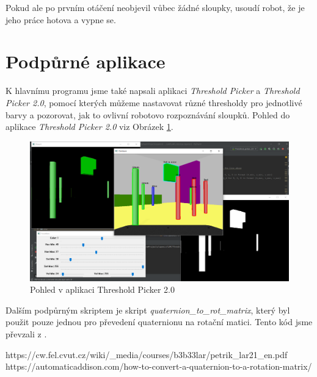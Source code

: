 \documentclass{article}
\begin{document}
Pokud ale po prvním otáčení neobjevil vůbec žádné sloupky, usoudí robot, že je jeho práce hotova a vypne se.

\section{Podpůrné aplikace}
K hlavnímu programu jsme také napsali aplikaci \textit{Threshold Picker} a \textit{Threshold Picker 2.0}, pomocí kterých můžeme nastavovat různé thresholdy pro jednotlivé barvy a pozorovat, jak to ovlivní robotovo rozpoznávání sloupků. Pohled do aplikace \textit{Threshold Picker 2.0} viz Obrázek \ref{thr_picker}.
\begin{figure}[H]
	\centering
	\includegraphics[scale=0.3]{Threshold_Picker.png}
	\caption{Pohled v aplikaci Threshold Picker 2.0}
	\label{thr_picker}
\end{figure}
Dalším podpůrným skriptem je skript \textit{quaternion\_to\_rot\_matrix}, který byl použit pouze jednou pro převedení quaternionu na rotační matici. Tento kód jsme převzali z \cite{quaterniony}.

\begin{thebibliography}{}

https://cw.fel.cvut.cz/wiki/\_media/courses/b3b33lar/petrik\_lar21\_en.pdf
https://automaticaddison.com/how-to-convert-a-quaternion-to-a-rotation-matrix/
\end{thebibliography}
\end{document}
